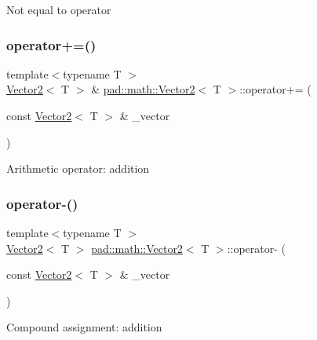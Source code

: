 Not equal to operator \mbox{\label{structpad_1_1math_1_1_vector2_a5c5fa87e2a0f8b5d2e3223220dea22a4}} 
\subsubsection{\texorpdfstring{operator+=()}{operator+=()}}
{\footnotesize\ttfamily template$<$typename T $>$ \\
\mbox{\hyperlink{structpad_1_1math_1_1_vector2}{Vector2}}$<$ T $>$ \& \mbox{\hyperlink{structpad_1_1math_1_1_vector2}{pad\+::math\+::\+Vector2}}$<$ T $>$\+::operator+= (\begin{DoxyParamCaption}\item[{const \mbox{\hyperlink{structpad_1_1math_1_1_vector2}{Vector2}}$<$ T $>$ \&}]{\+\_\+vector }\end{DoxyParamCaption})}

Arithmetic operator\+: addition \mbox{\label{structpad_1_1math_1_1_vector2_a0d028e47bd7f8b2c26fc52c49bc2f973}} 
\subsubsection{\texorpdfstring{operator-\/()}{operator-()}}
{\footnotesize\ttfamily template$<$typename T $>$ \\
\mbox{\hyperlink{structpad_1_1math_1_1_vector2}{Vector2}}$<$ T $>$ \mbox{\hyperlink{structpad_1_1math_1_1_vector2}{pad\+::math\+::\+Vector2}}$<$ T $>$\+::operator-\/ (\begin{DoxyParamCaption}\item[{const \mbox{\hyperlink{structpad_1_1math_1_1_vector2}{Vector2}}$<$ T $>$ \&}]{\+\_\+vector }\end{DoxyParamCaption})}

Compound assignment\+: addition \mbox{\label{structpad_1_1math_1_1_vector2_a03d8723e7dc2ecb94b1b7e65ecb59ebb}} 
